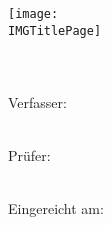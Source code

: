 \begin{titlepage}
\begin{center}

\texttt{[image: \\IMGTitlePage]}\\
\vspace{.7cm}
\Huge{\bfseries\DICTDocType}
~\vspace{.5cm}\\
\LARGE{\DICTDocTitle}
~\vspace{1.3cm}\\     

\large{
Verfasser:\\\vspace{1mm}
\DICTDocAuthor\\
\DICTDocAuthorAddress

\vspace{1.5cm}
Prüfer:\vspace{1mm}\\
\DICTDocExaminer\\
\DICTDocExaminerTwo

\vspace{1.5cm}
\DICTDocMajor

\vspace{1.5cm}
Eingereicht am:\vspace{1mm}\\
\DICTDocDueDate
}
\end{center}

\end{titlepage}
